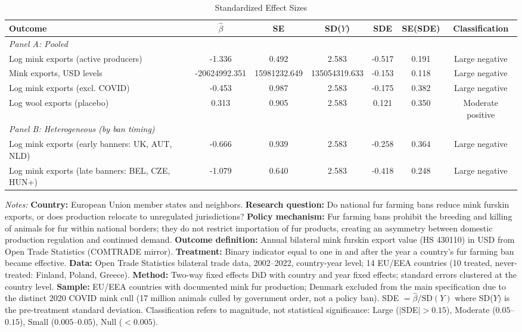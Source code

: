\begin{table}[t]
\begin{threeparttable}
\centering
\caption{Standardized Effect Sizes}
\label{tab:sde}
\begin{adjustbox}{max width=\textwidth}
\begin{tabular}{lcccccc}
\toprule
Outcome & $\hat{\beta}$ & SE & SD($Y$) & SDE & SE(SDE) & Classification \\
\midrule
\multicolumn{7}{l}{\textit{Panel A: Pooled}} \\
Log mink exports (active producers) & -1.336 & 0.492 & 2.583 & -0.517 & 0.191 & Large negative \\
Mink exports, USD levels & -20624992.351 & 15981232.649 & 135054319.633 & -0.153 & 0.118 & Large negative \\
Log mink exports (excl. COVID) & -0.453 & 0.987 & 2.583 & -0.175 & 0.382 & Large negative \\
Log wool exports (placebo) & 0.313 & 0.905 & 2.583 & 0.121 & 0.350 & Moderate positive \\
\midrule
\multicolumn{7}{l}{\textit{Panel B: Heterogeneous (by ban timing)}} \\
Log mink exports (early banners: UK, AUT, NLD) & -0.666 & 0.939 & 2.583 & -0.258 & 0.364 & Large negative \\
Log mink exports (late banners: BEL, CZE, HUN+) & -1.079 & 0.640 & 2.583 & -0.418 & 0.248 & Large negative \\
\bottomrule
\end{tabular}
\end{adjustbox}
\begin{tablenotes}
\item \textit{Notes:} \textbf{Country:} European Union member states and neighbors. \textbf{Research question:} Do national fur farming bans reduce mink furskin exports, or does production relocate to unregulated jurisdictions? \textbf{Policy mechanism:} Fur farming bans prohibit the breeding and killing of animals for fur within national borders; they do not restrict importation of fur products, creating an asymmetry between domestic production regulation and continued demand. \textbf{Outcome definition:} Annual bilateral mink furskin export value (HS 430110) in USD from Open Trade Statistics (COMTRADE mirror). \textbf{Treatment:} Binary indicator equal to one in and after the year a country's fur farming ban became effective. \textbf{Data:} Open Trade Statistics bilateral trade data, 2002--2022, country-year level; 14 EU/EEA countries (10 treated, never-treated: Finland, Poland, Greece). \textbf{Method:} Two-way fixed effects DiD with country and year fixed effects; standard errors clustered at the country level. \textbf{Sample:} EU/EEA countries with documented mink fur production; Denmark excluded from the main specification due to the distinct 2020 COVID mink cull (17 million animals culled by government order, not a policy ban). SDE $= \hat{\beta} / \text{SD}(Y)$ where SD($Y$) is the pre-treatment standard deviation. Classification refers to magnitude, not statistical significance: Large ($|$SDE$| > 0.15$), Moderate ($0.05$--$0.15$), Small ($0.005$--$0.05$), Null ($< 0.005$).

\end{tablenotes}
\end{threeparttable}
\end{table}
